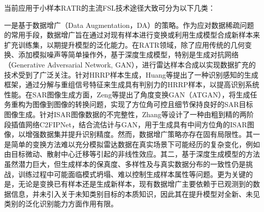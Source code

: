 当前应用于小样本RATR的主流FSL技术途径大致可分为以下几类：

一是基于数据增广（Data Augmentation，DA）的策略。作为应对数据稀疏问题的常用手段，数据增广旨在通过对现有样本进行变换或利用生成模型合成新样本来扩充训练集，以期提升模型的泛化能力。在RATR领域，除了应用传统的几何变换、添加模拟噪声等简单操作外，基于深度生成模型，特别是生成对抗网络（Generative Adversarial Network, GAN），进行雷达样本合成以实现数据扩充的技术受到了广泛关注。针对HRRP样本生成，Huang等提出了一种识别感知的生成框架，通过分解与重组信号特征来生成具有判别力的HRRP样本，以提高识别系统性能。在SAR图像生成方面，Zeng等提出了角度变换GAN（ATGAN），将生成任务重构为图像到图像的转换问题，实现了方位角可控且细节保持良好的SAR目标图像生成。针对ISAR图像数据的不完整性，Zhang等设计了一种由粗到精的两阶段插值网络C2FIPNet，结合流估计与GAN，用于生成具有中间方位角的ISAR图像，以增强数据集并提升识别精度。然而，数据增广策略亦存在固有局限性。其一是简单的变换方法难以充分模拟雷达数据在真实场景下可能经历的复杂变化，例如由目标微动、散射中心迁移等引起的非线性效应。其二，基于深度生成模型的方法虽然潜力巨大，但生成样本的保真度、多样性及与真实数据分布的一致性仍是挑战，训练过程中可能面临模式坍塌、难以控制生成样本属性等问题。更为关键的是，无论是变换已有样本还是生成新样本，现有数据增广主要依赖于已观测到的数据信息，并未引入关于未知类别目标的本质知识，因此其在提升模型对全新、未见类别的泛化识别能力方面作用有限。

